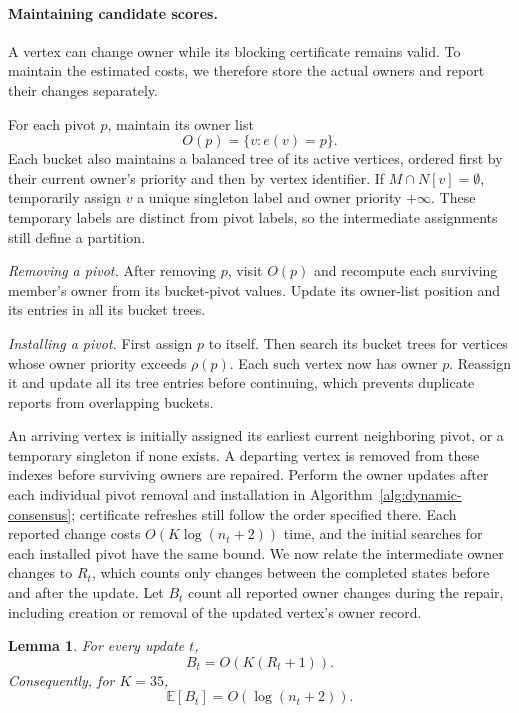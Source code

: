 \documentclass[11pt]{article}
\newtheorem{lemma}[theorem]{Lemma}
\theoremstyle{definition}
\theoremstyle{remark}
\newcommand{\1}{\mathbf{1}}
\begin{document}
\paragraph{Maintaining candidate scores.}

A vertex can change owner while its blocking certificate remains valid. To maintain the estimated costs, we therefore store the actual owners and report their changes separately.

For each pivot $p$, maintain its owner list
\[
    O(p)=\{v:e(v)=p\}.
\]
Each bucket also maintains a balanced tree of its active vertices, ordered first by their current owner's priority and then by vertex identifier. If $M\cap N[v]=\emptyset$, temporarily assign $v$ a unique singleton label and owner priority $+\infty$. These temporary labels are distinct from pivot labels, so the intermediate assignments still define a partition.

\emph{Removing a pivot.} After removing $p$, visit $O(p)$ and recompute each surviving member's owner from its bucket-pivot values. Update its owner-list position and its entries in all its bucket trees.

\emph{Installing a pivot.} First assign $p$ to itself. Then search its bucket trees for vertices whose owner priority exceeds $\rho(p)$. Each such vertex now has owner $p$. Reassign it and update all its tree entries before continuing, which prevents duplicate reports from overlapping buckets.

An arriving vertex is initially assigned its earliest current neighboring pivot, or a temporary singleton if none exists. A departing vertex is removed from these indexes before surviving owners are repaired. Perform the owner updates after each individual pivot removal and installation in Algorithm~\ref{alg:dynamic-consensus}; certificate refreshes still follow the order specified there.
Each reported change costs $O(K\log(n_t+2))$ time, and the initial searches for each installed pivot have the same bound.
We now relate the intermediate owner changes to $R_t$, which counts only changes between the completed states before and after the update. Let $B_t$ count all reported owner changes during the repair, including creation or removal of the updated vertex's owner record.

\begin{lemma}
\label{lem:owner-reporting}
For every update $t$,
\[
    B_t=O(K(R_t+1)).
\]
Consequently, for $K=35$,
\[
    \mathbb E[B_t]=O(\log(n_t+2)).
\]
\end{lemma}
\end{document}
